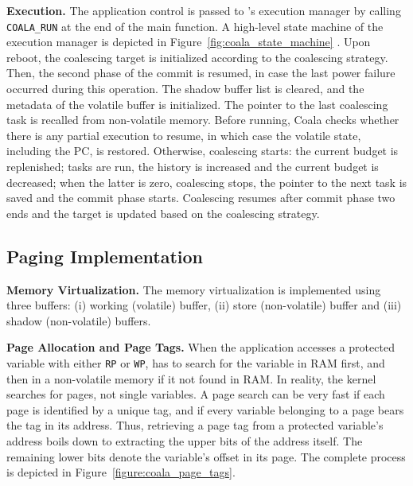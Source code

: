 \noindent \textbf{Execution.} The application control is passed to \sys's execution manager by calling \texttt{COALA\_RUN} at the end of the main function. A high-level state machine of the execution manager is depicted in Figure~\ref{fig:coala_state_machine} . Upon reboot, the coalescing target is initialized according to the coalescing strategy. Then, the second phase of the commit is resumed, in case the last power failure occurred during this operation. The shadow buffer list is cleared, and the metadata of the volatile buffer is initialized. The pointer to the last coalescing task is recalled from non-volatile memory. Before running, Coala checks whether there is any partial execution to resume, in which case the volatile state, including the PC, is restored. Otherwise, coalescing starts: the current budget is replenished; tasks are run, the history is increased and the current budget is decreased; when the latter is zero, coalescing stops, the pointer to the next task is saved and the commit phase starts. Coalescing resumes after commit phase two ends and the target is updated based on the coalescing strategy. 

\subsection{\sys Paging Implementation}

\noindent \textbf{Memory Virtualization.} The memory virtualization is implemented using three buffers: (i) working (volatile) buffer, (ii) store (non-volatile) buffer and (iii) shadow (non-volatile) buffers. 

\noindent \textbf{Page Allocation and Page Tags.} When the \sys application accesses a protected variable with either \texttt{RP} or \texttt{WP}, \sys has to search for the variable in RAM first, and then in a non-volatile memory if it not found in RAM. In reality, the \sys kernel searches for pages, not single variables. A page search can be very fast if each page is identified by a unique tag, and if every variable belonging to a page bears the tag in its address. Thus, retrieving a page tag from a protected variable's address boils down to extracting the upper bits of the address itself. The remaining lower bits denote the variable's offset in its page. The complete process is depicted in Figure~\ref{figure:coala_page_tags}.

